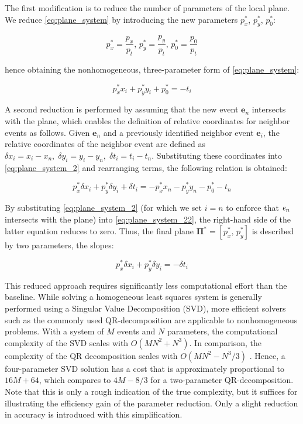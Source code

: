 The first modification is to reduce the number of parameters of the local plane. We reduce \cref{eq:plane_system} by introducing the new parameters $p_x^\ast$, $p_y^\ast$, $p_0^\ast$:

\begin{equation}
p_x^ *  = \frac{{{p_x}}}{{{p_t}}},\, p_y^ *  = \frac{{{p_y}}}{{{p_t}}},\, p_0^ *  = \frac{{{p_0}}}{{{p_t}}}
\end{equation}

hence obtaining the nonhomogeneous, three-parameter form of \cref{eq:plane_system}:

\begin{equation}
\label{eq:plane_system_2}
p_x^* x_i + p_y^* y_i + p_0^* = -t_i
\end{equation}

A second reduction is performed by assuming that the new event $\mathbf{e}_n$ intersects with the plane, which enables the definition of relative coordinates for neighbor events as follows. Given $\mathbf{e}_n$ and a previously identified neighbor event $\mathbf{e}_i$, the relative coordinates of the neighbor event are defined as $\delta x_i = x_i - x_n,\; \delta y_i = y_i - y_n,\; \delta t_i = t_i - t_n$. Substituting these coordinates into \cref{eq:plane_system_2} and rearranging terms, the following relation is obtained: 

\begin{equation}
\label{eq:plane_system_22}
p_x^*\delta {x_i} + p_y^*\delta {y_i} + \delta {t_i} =  - p_x^*{x_n} - p_y^*{y_n} - p_0^* - {t_n}
\end{equation}

By substituting \cref{eq:plane_system_2} (for which we set $i=n$ to enforce that $\emph{e}_n$ intersects with the plane) into \cref{eq:plane_system_22}, the right-hand side of the latter equation reduces to zero. Thus, the final plane $\mathbf{\Pi}^\ast=\left[p_x^\ast,\, p_y^\ast\right]$ is described by two parameters, the slopes:

\begin{equation}
\label{eq:plane_system_3}
p_x^* \delta x_i + p_y^* \delta y_i =  - \delta t_i
\end{equation}

This reduced approach requires significantly less computational effort than the baseline. While solving a homogeneous least squares system is generally performed using a Singular Value Decomposition (SVD), more efficient solvers such as the commonly used QR-decomposition are applicable to nonhomogeneous problems. With a system of $M$ events and $N$ parameters, the computational complexity of the SVD scales with $O(MN^2+N^3)$. In comparison, the complexity of the QR decomposition scales with $O(MN^2-N^3/3)$ \cite{Heath2002}. Hence, a four-parameter SVD solution has a cost that is approximately proportional to $16M+64$, which compares to $4M-8/3$ for a two-parameter QR-decomposition. Note that this is only a rough indication of the true complexity, but it suffices for illustrating the efficiency gain of the parameter reduction. Only a slight reduction in accuracy is introduced with this simplification.

